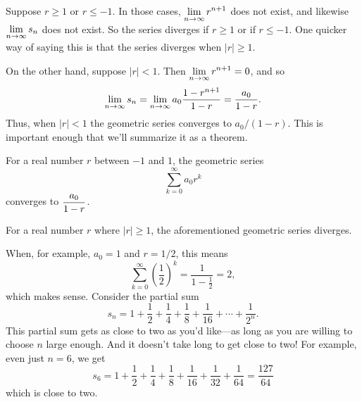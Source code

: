 Suppose $r \geq 1$ or $r \leq -1$.  In those cases, $\displaystyle\lim_{n \to
  \infty} r^{n+1}$ does not exist, and likewise $\displaystyle\lim_{n \to
  \infty} s_n$ does not exist.  So the series diverges if $r \geq 1$
or if $r \leq -1$.  One quicker way of saying this is that the series
diverges when $|r| \geq 1$.

On the other hand, suppose $|r| < 1$.  Then $\displaystyle\lim_{n\to\infty} r^{n+1}=0$, and so
$$
  \lim_{n\to\infty}s_n=\lim_{n\to\infty}a_0{1-r^{n+1}\over 1-r}=
  \frac{a_0}{1-r}.
$$ 
Thus, when $|r|<1$ the geometric series converges to $a_0/(1-r)$.   This is important enough that we'll summarize it as a theorem.

\begin{theorem}\label{thm:geometric-series}
  For a real number $r$ between $-1$ and $1$, the geometric series
  $$
  \sum_{k=0}^\infty a_0 r^k
  $$
  converges to $\displaystyle\frac{a_0}{1-r}$.

  For a real number $r$ where $|r| \geq 1$, the aforementioned
  geometric series diverges.
\end{theorem}

\begin{example}
\label{example:sum-of-half-powers}
  When, for example, $a_0=1$ and $r=1/2$, this means
$$
\sum_{k=0}^\infty \left( \frac{1}{2} \right)^k = \frac{1}{1 - \frac{1}{2}} = 2,
$$
which makes sense.  Consider the partial sum
$$
s_n = 1 + \frac{1}{2} 
 + \frac{1}{4} 
 + \frac{1}{8} 
 + \frac{1}{16}  + \cdots + \frac{1}{2^n}.
$$
This partial sum gets as close to two as you'd like---as long as you are willing to choose $n$ large enough.  And it doesn't take long to get close to two!  For example, even just $n=6$, we get
$$
s_6 = 
1
+ \frac{1}{2} 
+ \frac{1}{4} 
+ \frac{1}{8} 
+ \frac{1}{16} 
+ \frac{1}{32} 
+ \frac{1}{64} = \frac{127}{64}
$$
which is close to two.
\end{example}

